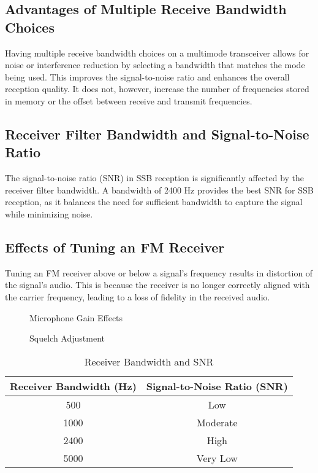 \subsection*{Advantages of Multiple Receive Bandwidth Choices}
Having multiple receive bandwidth choices on a multimode transceiver allows for noise or interference reduction by selecting a bandwidth that matches the mode being used. This improves the signal-to-noise ratio and enhances the overall reception quality. It does not, however, increase the number of frequencies stored in memory or the offset between receive and transmit frequencies.

\subsection*{Receiver Filter Bandwidth and Signal-to-Noise Ratio}
The signal-to-noise ratio (SNR) in SSB reception is significantly affected by the receiver filter bandwidth. A bandwidth of 2400 Hz provides the best SNR for SSB reception, as it balances the need for sufficient bandwidth to capture the signal while minimizing noise.

\subsection*{Effects of Tuning an FM Receiver}
Tuning an FM receiver above or below a signal's frequency results in distortion of the signal's audio. This is because the receiver is no longer correctly aligned with the carrier frequency, leading to a loss of fidelity in the received audio.

\begin{figure}[h]
    \centering
    \caption{Microphone Gain Effects}
    \label{fig:microphone_gain}
\end{figure}

\begin{figure}[h]
    \centering
    \caption{Squelch Adjustment}
    \label{fig:squelch_adjustment}
\end{figure}

\begin{table}[h]
    \centering
    \begin{tabular}{|c|c|}
        \hline
        \textbf{Receiver Bandwidth (Hz)} & \textbf{Signal-to-Noise Ratio (SNR)} \\
        \hline
        500 & Low \\
        1000 & Moderate \\
        2400 & High \\
        5000 & Very Low \\
        \hline
    \end{tabular}
    \caption{Receiver Bandwidth and SNR}
    \label{tab:receiver_bandwidth}
\end{table}


